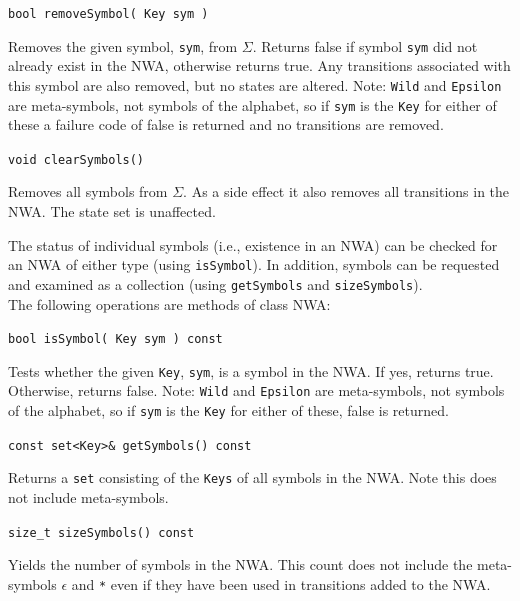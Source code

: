\documentclass{llncs}
\begin{document}
\begin{description}

  \item\texttt{bool removeSymbol( Key sym )} \nopagebreak

    Removes the given symbol, \texttt{sym}, from $\Sigma$.  Returns false if symbol \texttt{sym} did not already exist in the NWA, otherwise returns true.  Any transitions associated with this symbol are also removed, but no states are altered.  Note: \texttt{Wild} and \texttt{Epsilon} are meta-symbols, not symbols of the alphabet, so if \texttt{sym} is the \texttt{Key} for either of these a failure code of false is returned and no transitions are removed. 

  \item\texttt{void clearSymbols()} \nopagebreak

    Removes all symbols from $\Sigma$.  As a side effect it also removes all transitions in the NWA.  The state set is unaffected. \\

\end{description}

The status of individual symbols (i.e., existence in an NWA) can be checked for an NWA of either type (using \texttt{isSymbol}).  In addition, symbols can be requested and examined as a collection (using \texttt{getSymbols} and \texttt{sizeSymbols}). \\

\noindent The following operations are methods of class NWA:

\begin{description}

  \item\texttt{bool isSymbol( Key sym ) const} \nopagebreak

    Tests whether the given \texttt{Key}, \texttt{sym}, is a symbol in the NWA.  If yes, returns true.  Otherwise, returns false.  Note: \texttt{Wild} and \texttt{Epsilon} are meta-symbols, not symbols of the alphabet, so if \texttt{sym} is the \texttt{Key} for either of these, false is returned.

  \item\texttt{const set<Key>\& getSymbols() const} \nopagebreak

    Returns a \texttt{set} consisting of the \texttt{Keys} of all symbols in the NWA.  Note this does not include meta-symbols.

  \item\texttt{size\_t sizeSymbols() const} \nopagebreak

    Yields the number of symbols in the NWA.  This count does not include the meta-symbols \texttt{$\epsilon$} and \texttt{*} even if they have been used in transitions added to the NWA. \\

\end{description}
\end{document}
